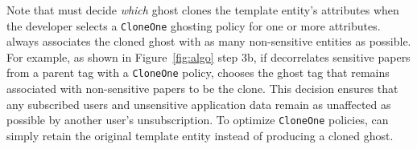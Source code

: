 Note that \sys must decide \emph{which} ghost clones the template entity's attributes when the
developer selects a \texttt{CloneOne} ghosting policy for one or more attributes. \sys always
associates the cloned ghost with as many non-sensitive entities as possible. For example, as shown
in Figure~\ref{fig:algo} step 3b, if \sys decorrelates sensitive papers from a parent tag with a
\texttt{CloneOne} policy, \sys chooses the ghost tag that remains associated with non-sensitive
papers to be the clone. This decision ensures that any subscribed users and unsensitive application
data remain as unaffected as possible by another user's unsubscription. To optimize
\texttt{CloneOne} policies, \sys can simply retain the original template entity instead of producing
a cloned ghost.
\fi

